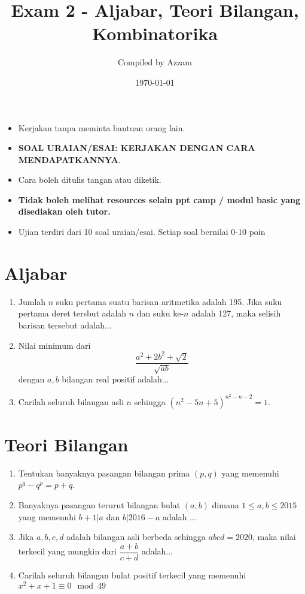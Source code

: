 \documentclass[11pt]{scrartcl}
\title{Exam 2 - Aljabar, Teori Bilangan, Kombinatorika} %
\date{\today}
\author{Compiled by Azzam}
\begin{document}
\maketitle
\begin{remark*}
    \begin{itemize}
    \item Kerjakan tanpa meminta bantuan orang lain.
    \item \textbf{SOAL URAIAN/ESAI: KERJAKAN DENGAN CARA MENDAPATKANNYA}.
    \item Cara boleh ditulis tangan atau diketik. 
    \item \textbf{Tidak boleh melihat resources selain ppt camp / modul basic yang disediakan oleh tutor.}
    \item Ujian terdiri dari 10 soal uraian/esai. Setiap soal bernilai 0-10 poin
    \end{itemize}
\end{remark*}
\section{Aljabar}
\begin{enumerate}
      \item Jumlah $n$ suku pertama suatu barisan aritmetika adalah 195. Jika suku pertama deret tersbut adalah $n$ dan suku ke-$n$ adalah 127, maka selisih barisan tersebut adalah...

      \item Nilai minimum dari $$\frac{a^2+2b^2+\sqrt{2}}{\sqrt{ab}}$$ dengan $a,b$ bilangan real positif adalah...

      \item Carilah seluruh bilangan asli $n$ sehingga $(n^2-5n+5)^{n^2-n-2}=1$.
\end{enumerate}

\section{Teori Bilangan}
\begin{enumerate}[resume]
    \item Tentukan banyaknya pasangan bilangan prima $(p,q)$ yang memenuhi $p^q-q^p = p+q$.

    \item Banyaknya pasangan terurut bilangan bulat $(a, b)$ dimana $1 \le a, b \le 2015$ yang memenuhi $b + 1|a$ dan $b|2016 - a$ adalah ...

    \item Jika $a,b,c,d$ adalah bilangan asli berbeda sehingga $abcd=2020$, maka nilai terkecil yang mungkin dari $\dfrac{a+b}{c+d}$ adalah...

    \item Carilah seluruh bilangan bulat positif terkecil yang memenuhi $x^2+x+1 \equiv 0 \mod 49$
\end{enumerate}
\end{document}
